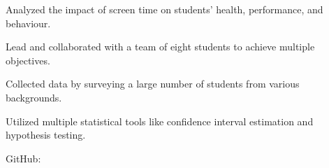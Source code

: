 \begin{resume_list}
  \item Analyzed the impact of screen time on students' health, performance, and behaviour.
  \item Lead and collaborated with a team of eight students to achieve multiple objectives.
  \item Collected data by surveying a large number of students from various backgrounds.
  \item Utilized multiple statistical tools like confidence interval estimation and hypothesis testing.
  \item GitHub: 
\end{resume_list}
